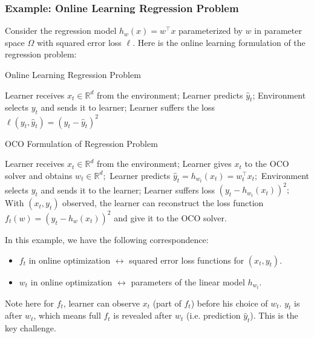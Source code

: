 \documentclass{article}
\begin{document}
\subsubsection{Example: Online Learning Regression Problem}
Consider the regression model $h_{w}(x)=w^{\top} x$ parameterized by $w$ in parameter space $\Omega$ with squared error loss $\ell$. Here is the online learning formulation of the regression problem:


\begin{algorithm}[H]
    \caption{Online Learning Regression Problem}\label{algo:olr}
    \begin{algorithmic}[1]
                \STATE Learner receives $x_{t} \in \mathbb{R}^{d}$ from the environment;
                \STATE Learner predicts $\hat{y}_t$;
                \STATE Environment selects $y_t$ and sends it to learner;
                \STATE  Learner suffers the loss $\ell(y_t,\hat{y}_t)=(y_t-\hat{y}_t)^2$
        \ENDFOR
    \end{algorithmic}
\end{algorithm}
\begin{algorithm}
    \caption{OCO Formulation of Regression Problem}\label{algo:ocolr}
    \begin{algorithmic}[1]
                \STATE Learner receives $x_{t} \in \mathbb{R}^{d}$ from the environment;
                \STATE Learner gives $x_{t}$ to the OCO solver and obtains $w_{t} \in \mathbb{R}^{d} ;$ 
                \STATE Learner predicts $\hat{y}_{t}=h_{w_{t}}\left(x_{t}\right)=w_{t}^{\top} x_{t} ;$ 
                \STATE Environment selects $y_{t}$ and sends it to the learner;
                \STATE Learner suffers loss $\left(y_{t}-h_{w_{t}}\left(x_{t}\right)\right)^{2} ;$ 
                \STATE   With $\left(x_{t}, y_{t}\right)$ observed, the learner can reconstruct the loss function $f_{t}(w)=\left(y_{t}-h_{w}\left(x_{t}\right)\right)^{2}$ and 
give it to the OCO solver.
        \ENDFOR
    \end{algorithmic}
\end{algorithm}
In this example, we have the following correspondence:
\begin{itemize}
    \item $f_{t}$ in online optimization $\leftrightarrow$ squared error loss functions for $\left(x_{t}, y_{t}\right)$.
    \item  $w_{t}$ in online optimization $\leftrightarrow$ parameters of the linear model $h_{w_{t}}$.
\end{itemize}
\begin{rema}
Note here for $f_t$, learner can observe $x_t$ (part of $f_t$) before his choice of $w_t$. $y_t$ is after $w_t$, which means full $f_t$ is revealed after $w_t$ (i.e. prediction $\hat{y}_{t}$). This is the key challenge.
\end{rema}
\end{document}
